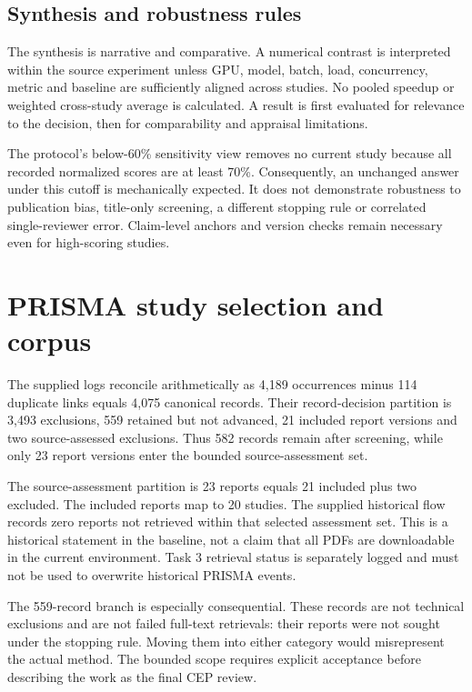 \subsection{Synthesis and robustness rules}
The synthesis is narrative and comparative. A numerical contrast is interpreted within the source experiment unless GPU, model, batch, load, concurrency, metric and baseline are sufficiently aligned across studies. No pooled speedup or weighted cross-study average is calculated. A result is first evaluated for relevance to the decision, then for comparability and appraisal limitations.

The protocol's below-60\% sensitivity view removes no current study because all recorded normalized scores are at least 70\%. Consequently, an unchanged answer under this cutoff is mechanically expected. It does not demonstrate robustness to publication bias, title-only screening, a different stopping rule or correlated single-reviewer error. Claim-level anchors and version checks remain necessary even for high-scoring studies.

\section{PRISMA study selection and corpus}
The supplied logs reconcile arithmetically as 4,189 occurrences minus 114 duplicate links equals 4,075 canonical records. Their record-decision partition is 3,493 exclusions, 559 retained but not advanced, 21 included report versions and two source-assessed exclusions. Thus 582 records remain after screening, while only 23 report versions enter the bounded source-assessment set.

The source-assessment partition is 23 reports equals 21 included plus two excluded. The included reports map to 20 studies. The supplied historical flow records zero reports not retrieved within that selected assessment set. This is a historical statement in the baseline, not a claim that all PDFs are downloadable in the current environment. Task 3 retrieval status is separately logged and must not be used to overwrite historical PRISMA events.

The 559-record branch is especially consequential. These records are not technical exclusions and are not failed full-text retrievals: their reports were not sought under the stopping rule. Moving them into either category would misrepresent the actual method. The bounded scope requires explicit acceptance before describing the work as the final CEP review.

